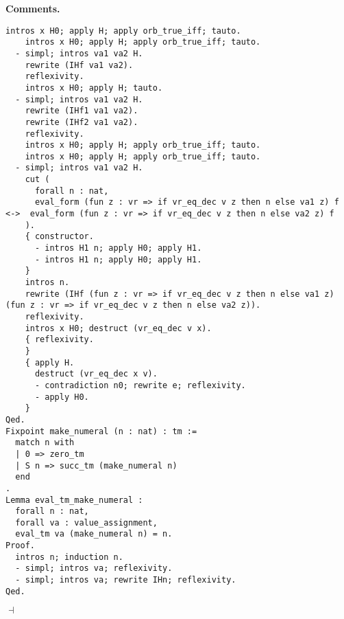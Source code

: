 \documentclass[12pt]{paper}
\newenvironment{context}[1][]{\noindent \textbf{{#1}.}}{\hfill $ \dashv $}
\begin{document}
\begin{context}[Comments]
\begin{lstlisting}[frame=single]
    intros x H0; apply H; apply orb_true_iff; tauto.
    intros x H0; apply H; apply orb_true_iff; tauto.
  - simpl; intros va1 va2 H.
    rewrite (IHf va1 va2).
    reflexivity.
    intros x H0; apply H; tauto.
  - simpl; intros va1 va2 H.
    rewrite (IHf1 va1 va2).
    rewrite (IHf2 va1 va2).
    reflexivity.
    intros x H0; apply H; apply orb_true_iff; tauto.
    intros x H0; apply H; apply orb_true_iff; tauto.
  - simpl; intros va1 va2 H.
    cut (
      forall n : nat,
      eval_form (fun z : vr => if vr_eq_dec v z then n else va1 z) f <->  eval_form (fun z : vr => if vr_eq_dec v z then n else va2 z) f
    ).
    { constructor.
      - intros H1 n; apply H0; apply H1.
      - intros H1 n; apply H0; apply H1.
    }
    intros n.
    rewrite (IHf (fun z : vr => if vr_eq_dec v z then n else va1 z) (fun z : vr => if vr_eq_dec v z then n else va2 z)).
    reflexivity.
    intros x H0; destruct (vr_eq_dec v x).
    { reflexivity.
    }
    { apply H.
      destruct (vr_eq_dec x v).
      - contradiction n0; rewrite e; reflexivity.
      - apply H0.
    }
Qed.
Fixpoint make_numeral (n : nat) : tm :=
  match n with
  | 0 => zero_tm
  | S n => succ_tm (make_numeral n)
  end
.
Lemma eval_tm_make_numeral :
  forall n : nat,
  forall va : value_assignment,
  eval_tm va (make_numeral n) = n.
Proof.
  intros n; induction n.
  - simpl; intros va; reflexivity.
  - simpl; intros va; rewrite IHn; reflexivity.
Qed.
\end{lstlisting}


\end{context}
\end{document}

